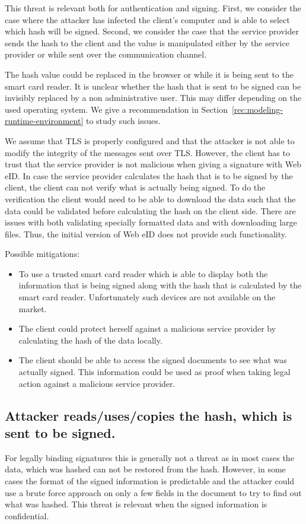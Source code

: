 This threat is relevant both for authentication and signing. First, we consider the case where the attacker has infected the client's computer and is able to select which hash will be signed. Second, we consider the case that the service provider sends the hash to the client and the value is manipulated either by the service provider or  while sent over the communication channel.

The hash value could be replaced in the browser or while it is being sent to the smart card reader. It is unclear whether the hash that is sent to be signed can be invisibly replaced by a non administrative user. This may differ depending on the used operating system. We give a recommendation in Section~\ref{rec:modeling-runtime-environment} to study such issues.

We assume that TLS is properly configured and that the attacker is not able to modify the integrity of the messages sent over TLS. However, the client has to trust that the service provider is not malicious when giving a signature with Web eID. In case the service provider calculates the hash that is to be signed by the client, the client can not verify what is actually being signed. To do the verification the client would need to be able to download the data such that the data could be validated before calculating the hash on the client side.  There are issues with both validating specially formatted data and with downloading large files. Thus, the initial version of Web eID does not provide such functionality. 

Possible mitigations:
\begin{itemize}
\item To use a trusted smart card reader which is able to display both the information that is being signed along with the hash that is calculated by the smart card reader. Unfortunately such devices are not available on the market.

\item The client could protect herself against a malicious service provider by calculating the hash of the data locally.

\item The client should be able to access the signed documents to see what was actually signed. This information could be used as proof when taking legal action against a malicious service provider.
\end{itemize}


\subsection{Attacker reads/uses/copies the hash, which is sent to be signed.}
\label{threat:read-hash-for-signing}
For legally binding signatures this is generally not a threat as in most cases the data, which was hashed can not be restored from the hash. However, in some cases the format of the signed information is predictable and the attacker could use a brute force approach on only a few fields in the document to try to find out what was hashed. This threat is relevant when the signed information is confidential.

